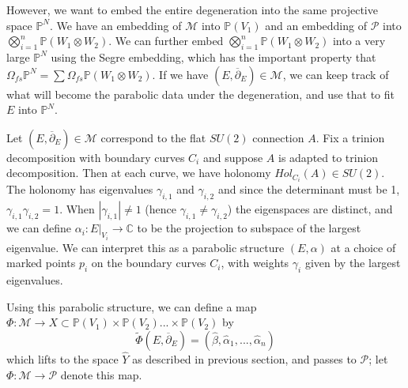 \documentclass[]{article}
\newcommand{\PP}{\mathbb{P}}
\newcommand{\C}{\mathbb{C}}
\newcommand{\MM}{\mathcal{M}}
\newcommand{\dbar}{\overline{\partial}}
\newcommand{\cP}{\mathcal{P}}
\begin{document}
	However, we want to embed the entire degeneration into the same projective space $\PP^N$. We have an embedding of $\MM$ into $\PP(V_1)$ and an embedding of $\cP$ into $\bigotimes_{i=1}^n \PP(W_1 \otimes W_2)$. We can further embed $\bigotimes_{i=1}^n \PP(W_1 \otimes W_2)$ into a very large $\PP^N$ using the Segre embedding, which has the important property that $\Omega_{fs} \PP^N = \sum \Omega_{fs} \PP(W_1\otimes W_2)$. If we have $(E,\dbar_E)\in\MM$, we can keep track of what will become the parabolic data under the degeneration, and use that to fit $E$ into $\PP^N$.
	
	Let $(E,\dbar_E)\in \MM$ correspond to the flat $SU(2)$ connection $A$. Fix a trinion decomposition with boundary curves $C_i$ and suppose $A$ is adapted to trinion decomposition. Then at each curve, we have holonomy $Hol_{C_i}(A) \in SU(2)$. The holonomy has eigenvalues $\gamma_{i,1}$ and $\gamma_{i,2}$ and since the determinant must be 1, $\gamma_{i,1}\gamma_{i,2} = 1$. When $|\gamma_{i,1}|\neq 1$ (hence $\gamma_{i,1} \neq \gamma_{i,2}$) the eigenspaces are distinct, and we can define $\alpha_i:E|_{V_i} \to \C$ to be the projection to subspace of the largest eigenvalue. We can interpret this as a parabolic structure $(E,\alpha)$ at a choice of marked points $p_i$ on the boundary curves $C_i$, with weights $\gamma_i$ given by the largest eigenvalues.
	
	Using this parabolic structure, we can define a map $\Phi:\MM \to X \subset \PP(V_1)\times\PP(V_2)...\times\PP(V_2)$ by
	\begin{equation}
		\tilde{\Phi}(E,\dbar_E) = (\hat{\beta},\hat{\alpha}_1,...,\hat{\alpha}_n)
	\end{equation}
	which lifts to the space $\hat{Y}$ as described in previous section, and passes to $\cP$; let $\Phi:\MM\to\cP$ denote this map. 
\end{document}
